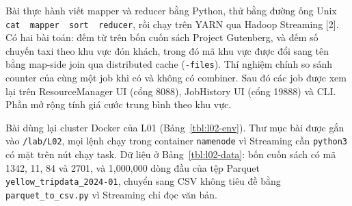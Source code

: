 \documentclass[
  12pt,
  a4paper,
]{report}
\begin{document}
Bài thực hành viết mapper và reducer bằng Python, thử bằng đường ống
Unix
\texttt{cat\ \textbar{}\ mapper\ \textbar{}\ sort\ \textbar{}\ reducer}\allowbreak{},
rồi chạy trên YARN qua Hadoop Streaming {[}2{]}. Có hai bài toán: đếm từ
trên bốn cuốn sách Project Gutenberg, và đếm số chuyến taxi theo khu vực
đón khách, trong đó mã khu vực được đổi sang tên bằng map-side join qua
distributed cache (\texttt{-files}). Thí nghiệm chính so sánh counter
của cùng một job khi có và không có combiner. Sau đó các job được xem
lại trên ResourceManager UI (cổng 8088), JobHistory UI (cổng 19888) và
CLI. Phần mở rộng tính giá cước trung bình theo khu vực.

Bài dùng lại cluster Docker của L01 (Bảng~\ref{tbl:l02-env}). Thư mục
bài được gắn vào \texttt{/lab/L02}, mọi lệnh chạy trong container
\texttt{namenode} vì Streaming cần \texttt{python3} có mặt trên nút chạy
task. Dữ liệu ở Bảng~\ref{tbl:l02-data}: bốn cuốn sách có mã 1342, 11,
84 và 2701, và 1,000,000 dòng đầu của tệp Parquet
\texttt{yellow\_}\allowbreak{}\texttt{tripdata\_}\allowbreak{}\texttt{2024-01}\allowbreak{},
chuyển sang CSV không tiêu đề bằng
\texttt{parquet\_}\allowbreak{}\texttt{to\_}\allowbreak{}\texttt{csv.}\allowbreak{}\texttt{py}\allowbreak{}
vì Streaming chỉ đọc văn bản.
\end{document}
